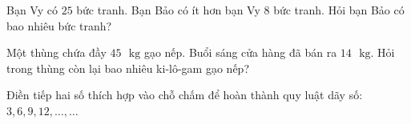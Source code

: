 \begin{bt}[1,5 điểm]
Bạn Vy có $25$ bức tranh. Bạn Bảo có ít hơn bạn Vy $8$ bức tranh. Hỏi bạn Bảo có bao nhiêu bức tranh?
\end{bt}

\begin{bt}[1,0 điểm]
Một thùng chứa đầy $45\text{ }\text{kg}$ gạo nếp. Buổi sáng cửa hàng đã bán ra $14\text{ }\text{kg}$. Hỏi trong thùng còn lại bao nhiêu ki-lô-gam gạo nếp?
\end{bt}

\begin{bt}[1,0 điểm]
Điền tiếp hai số thích hợp vào chỗ chấm để hoàn thành quy luật dãy số: $3, 6, 9, 12, \dots, \dots$
\end{bt}
